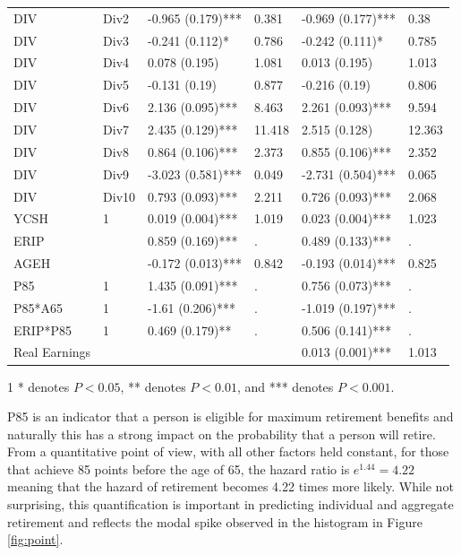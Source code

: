 \documentclass[12pt,letterpaper]{article}
\begin{document}
\begin{table}[htbp]
\begin{threeparttable}
\begin{tabular}{llL{2.5cm}L{1.5cm}L{2.5cm}L{1.5cm}}
			DIV & Div2  & -0.965 (0.179)*** & 0.381 & -0.969 (0.177)*** & 0.38 \\
			DIV & Div3  & -0.241 (0.112)* & 0.786 & -0.242 (0.111)* & 0.785 \\
			DIV & Div4  & 0.078 (0.195) & 1.081 & 0.013 (0.195) & 1.013 \\
			DIV & Div5  & -0.131 (0.19) & 0.877 & -0.216 (0.19) & 0.806 \\
			DIV & Div6  & 2.136 (0.095)*** & 8.463 & 2.261 (0.093)*** & 9.594 \\
			DIV & Div7  & 2.435 (0.129)*** & 11.418 & 2.515 (0.128) & 12.363 \\
			DIV & Div8  & 0.864 (0.106)*** & 2.373 & 0.855 (0.106)*** & 2.352 \\
			DIV & Div9  & -3.023 (0.581)*** & 0.049 & -2.731 (0.504)*** & 0.065 \\
			DIV & Div10 & 0.793 (0.093)*** & 2.211 & 0.726 (0.093)*** & 2.068 \\
			YCSH  & 1     & 0.019 (0.004)*** & 1.019 & 0.023 (0.004)*** & 1.023 \\
			ERIP  &       & 0.859 (0.169)*** & .     & 0.489 (0.133)*** & . \\
			AGEH  &       & -0.172 (0.013)*** & 0.842 & -0.193 (0.014)*** & 0.825 \\
			P85   & 1     & 1.435 (0.091)*** & .     & 0.756 (0.073)*** & . \\
			P85*A65 & 1     & -1.61 (0.206)*** & .     & -1.019 (0.197)*** & . \\
			ERIP*P85 & 1     & 0.469 (0.179)** & .     & 0.506 (0.141)*** & . \\
			Real Earnings &       &       &       & 0.013 (0.001)*** & 1.013 \\
			\bottomrule
		\end{tabular}%
		\begin{tablenotes}
			\item[1] * denotes $P<0.05$, ** denotes $P<0.01$, and *** denotes $P<0.001$.
		\end{tablenotes}
	\end{threeparttable}
	\label{tab:paraest.}%
\end{table}%
P85 is an indicator that a person is eligible for maximum retirement benefits and naturally this has a strong impact on the probability that a person will retire.  From a quantitative point of view, with all other factors held constant, for those that achieve 85 points before the age of 65, the hazard ratio is $e^{1.44} = 4.22$ meaning that the hazard of retirement becomes 4.22 times more likely.  While not surprising, this quantification is important in predicting individual and aggregate retirement and reflects the modal spike observed in the histogram in Figure \ref{fig:point}.
\end{document}
